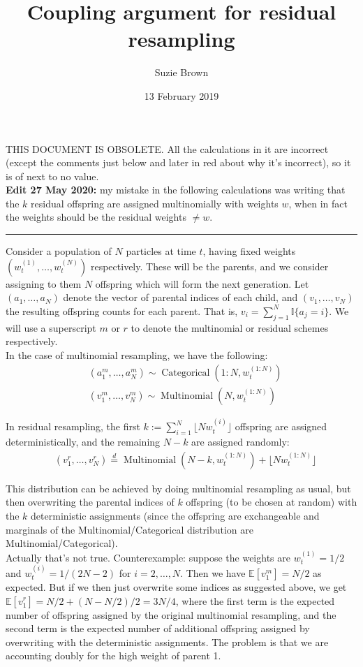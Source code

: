 \documentclass[fleqn]{article}
\title{Coupling argument for residual resampling}
\author{Suzie Brown}
\date{13 February 2019}
\newcommand{\E}{\mathbb{E}}
\newcommand{\eqdist}{\overset{d}{=}}
\newcommand{\I}[1]{\mathbb{I}\{#1\}}
\newcommand{\Mn}{\operatorname{Multinomial}}
\newcommand{\Cat}{\operatorname{Categorical}}
\newcommand{\wt}[2][t]{w_{#1}^{(#2)}}
\begin{document}
\maketitle
\thispagestyle{fancy}

THIS DOCUMENT IS OBSOLETE. All the calculations in it are incorrect (except the comments just below and later in red about why it's incorrect), so it is of next to no value.\\

\textbf{Edit 27 May 2020:} my mistake in the following calculations was writing that the $k$ residual offspring are assigned multinomially with weights $w$, when in fact the weights should be the residual weights $\neq w$.\\
\hrule

Consider a population of $N$ particles at time $t$, having fixed weights $(\wt{1},\dots, \wt{N})$ respectively. These will be the parents, and we consider assigning to them $N$ offspring which will form the next generation. 
Let $(a_1, \dots, a_N)$ denote the vector of parental indices of each child, and $(v_1, \dots, v_N)$ the resulting offspring counts for each parent. That is, $v_i = \sum_{j=1}^N \I{a_j = i} $. We will use a superscript $m$ or $r$ to denote the multinomial or residual schemes respectively.\\

In the case of multinomial resampling, we have the following:
\begin{align*}
& (a_1^m, \dots, a_N^m) \sim \Cat(1:N, \wt{1:N}) \\
& (v_1^m, \dots, v_N^m) \sim \Mn(N, \wt{1:N})
\end{align*}

In residual resampling, the first $k := \sum_{i=1}^N \lfloor N\wt{i} \rfloor$ offspring are assigned deterministically, and the remaining $N-k$ are assigned randomly:
\begin{align*}
& (v_1^r, \dots, v_N^r) \eqdist \Mn(N-k, \wt{1:N}) + \lfloor N \wt{1:N} \rfloor
\end{align*}

This distribution can be achieved by doing multinomial resampling as usual, but then overwriting the parental indices of $k$ offspring (to be chosen at random) with the $k$ deterministic assignments (since the offspring are exchangeable and marginals of the Multinomial/Categorical distribution are Multinomial/Categorical).\\

\color{red}
Actually that's not true. Counterexample: suppose the weights are $\wt{1} = 1/2$ and $\wt{i} = 1/(2N-2)$ for $i=2,\dots,N$. Then we have $\E[v_1^m] = N/2$ as expected. But if we then just overwrite some indices as suggested above, we get $\E[v_1^r] = N/2 + (N-N/2)/2 = 3N/4$, where the first term is the expected number of offspring assigned by the original multinomial resampling, and the second term is the expected number of additional offspring assigned by overwriting with the deterministic assignments. The problem is that we are accounting doubly for the high weight of parent 1.
\end{document}
